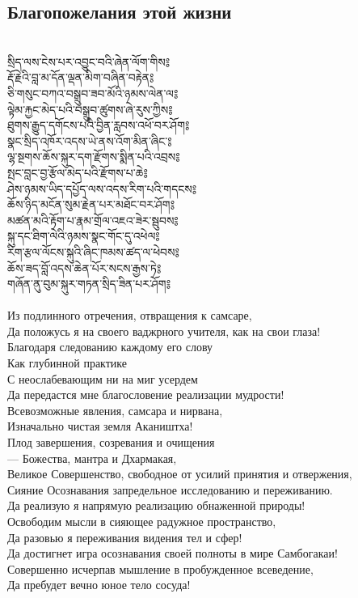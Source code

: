 \subsection{Благопожелания этой жизни}
\\
\ti
སྲིད་ལས་ངེས་པར་འབྱུང་བའི་ཞེན་ལོག་གིས༔\\
རྡོ་རྗེའི་བླ་མ་དོན་ལྡན་མིག་བཞིན་བརྟེན༔\\
ཅི་གསུང་བཀའ་བསྒྲུབ་ཟབ་མོའི་ཉམས་ལེན་ལ༔\\
ལྟེམ་རྐྱང་མེད་པའི་བསྒྲུབ་ཚུགས་ཞེ་རུས་ཀྱིས༔\\
ཐུགས་རྒྱུད་དགོངས་པའི་བྱིན་རླབས་འཕོ་བར་ཤོག༔\\
སྣང་སྲིད་འཁོར་འདས་ཡེ་ནས་འོག་མིན་ཞིང་༔\\
ལྷ་སྔགས་ཆོས་སྐུར་དག་རྫོགས་སྨིན་པའི་འབྲས༔\\
སྤང་བླང་བྱ་རྩོལ་མེད་པའི་རྫོགས་པ་ཆེ༔\\
ཤེས་ཉམས་ཡིད་དཔྱོད་ལས་འདས་རིག་པའི་གདངས༔\\
ཆོས་ཉིད་མངོན་སུམ་རྗེན་པར་མཐོང་བར་ཤོག༔\\
མཚན་མའི་རྟོག་པ་རྣམ་གྲོལ་འཇའ་ཟེར་སྦུབས༔\\
སྐུ་དང་ཐིག་ལེའི་ཉམས་སྣང་གོང་དུ་འཕེལ༔\\
རིག་རྩལ་ལོངས་སྐུའི་ཞིང་ཁམས་ཚད་ལ་ཕེབས༔\\
ཆོས་ཟད་བློ་འདས་ཆེན་པོར་སངས་རྒྱས་ཏེ༔\\
གཞོན་ནུ་བུམ་སྐུར་གཏན་སྲིད་ཟིན་པར་ཤོག༔\\
\\
\ru
Из подлинного отречения, отвращения к самсаре,\\
Да положусь я на своего ваджрного учителя, как на свои глаза!\\
Благодаря следованию каждому его слову\\
Как глубинной практике\\
С неослабевающим ни на миг усердем\\
Да передастся мне благословение реализации мудрости!\\
Всевозможные явления, самсара и нирвана,\\
Изначально чистая земля Акаништха!\\
Плод завершения, созревания и очищения\\
— Божества, мантра и Дхармакая,\\
Великое Совершенство, свободное от усилий принятия и отвержения,\\
Сияние Осознавания запредельное исследованию и переживанию.\\
Да реализую я напрямую реализацию обнаженной природы!\\
Освободим мысли в сияющее радужное пространство,\\
Да разовью я переживания видения тел и сфер!\\
Да достигнет игра осознавания своей полноты в мире Самбогакаи!\\
Совершенно исчерпав мышление в пробужденное всеведение,\\
Да пребудет вечно юное тело сосуда!\\
\\

